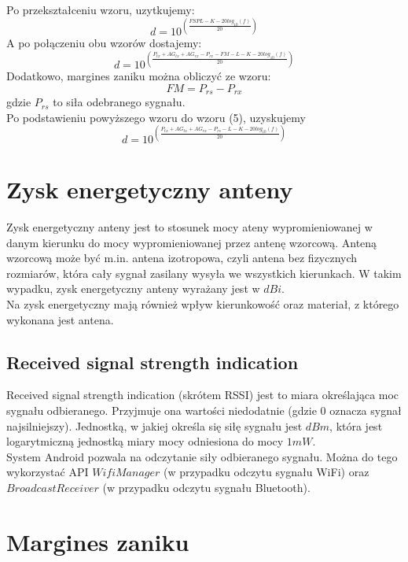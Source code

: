 Po przekształceniu wzoru, uzytkujemy:
\begin{equation}
d = 10^{\left(\frac{FSPL - K - 20log_{10}(f)}{20}\right)}
\end{equation}
A po połączeniu obu wzorów dostajemy:
\begin{equation}
d = 10^{\left(\frac{P_{tx} + AG_{tx} + AG_{rx} - P_{rx} - FM - L - K - 20log_{10}(f)}{20}\right)}
\end{equation}
Dodatkowo, margines zaniku można obliczyć ze wzoru:
\begin{equation}
FM = P_{rs} - P_{rx}
\end{equation}
gdzie $P_{rs}$ to siła odebranego sygnału.\\
Po podstawieniu powyższego wzoru do wzoru (5), uzyskujemy
\begin{equation}
d = 10^{\left(\frac{P_{tx} + AG_{tx} + AG_{rx} - P_{rs} - L - K - 20log_{10}(f)}{20}\right)}
\end{equation}
\section{Zysk energetyczny anteny}
Zysk energetyczny anteny jest to stosunek mocy ateny wypromieniowanej w danym kierunku do mocy wypromieniowanej przez antenę wzorcową. Anteną wzorcową może być m.in. antena izotropowa, czyli antena bez fizycznych rozmiarów, która cały sygnał zasilany wysyła we wszystkich kierunkach. W takim wypadku, zysk energetyczny anteny wyrażany jest w $dBi$.\\
Na zysk energetyczny mają również wpływ kierunkowość oraz materiał, z którego wykonana jest antena.
\subsection{Received signal strength indication}
Received signal strength indication (skrótem RSSI) jest to miara określająca moc sygnału odbieranego. Przyjmuje ona wartości niedodatnie (gdzie 0 oznacza sygnał najsilniejszy). Jednostką, w jakiej określa się siłę sygnału jest $dBm$, która jest logarytmiczną jednostką miary mocy odniesiona do mocy $1mW$.\\
System Android pozwala na odczytanie siły odbieranego sygnału. Można do tego wykorzystać API $WifiManager$ (w przypadku odczytu sygnału WiFi) oraz $BroadcastReceiver$ (w przypadku odczytu sygnału Bluetooth).
\section{Margines zaniku}